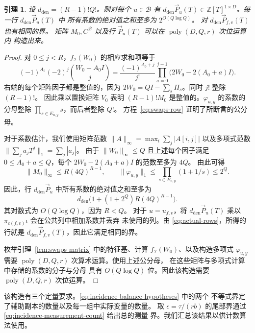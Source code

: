 \documentclass[11pt,reqno]{amsart}
\numberwithin{equation}{section}
\newtheorem{lemma}[theorem]{引理}
\theoremstyle{definition}\newtheorem{definition}[theorem]{定义}
\theoremstyle{remark}\newtheorem{remark}[theorem]{注}
\newcommand{\poly}{\operatorname{poly}}
\renewcommand{\le}{\leqslant}
\begin{document}
\begin{lemma}\label{lem:row-coefficients}
设 $d_{\mathrm{den}}=(R-1)!Q!$。则对每个 $u\in\mathcal B$ 有
$d_{\mathrm{den}}\vec{P}_u(T)\in\mathbb Z[T]^{1\times D}$。每一行 $d_{\mathrm{den}}\vec{P}_u(T)$ 中
所有系数的绝对值之和至多为 $2^{O(Q\log Q)}$。
对 $d_{\mathrm{den}}\vec{P}_{f,v}(T)$ 也有相同的界。
矩阵 $M_0,C^{\mathcal B}$ 以及行 $\vec{P}_u(T)$ 可以在 $\poly(D,Q,r)$ 次位运算内
构造出来。
\end{lemma}
\begin{proof}
对 $0\le j<R$，$f_{\mathcal I}(W_0)$ 的相应求和项等于
\[
 (-1)^{A_0}(-2)^j\binom{W_0-A_0I}{j}
 =\frac{(-1)^{A_0+j}}{j!}
   \prod_{a=0}^{j-1}\bigl(2W_0-2(A_0+a)I\bigr).
\]
右端的每个矩阵因子都是整值的，因为
$2W_0=QI-\sum_s\Pi_s$。同时 $j!$ 整除 $(R-1)!$。
因此乘以置换矩阵 $V_0$ 表明
$(R-1)!M_0$ 是整值的。$\varphi_{u,y}$ 的系数的
分母整除 $\prod_{s\in E_{u,y}}s$，而后者整除 $Q!$。
方程~\eqref{eq:swaps-row} 证明了所断言的公分母。

对于系数估计，我们使用矩阵范数
$\|A\|_\infty=\max_i\sum_j|A[i,j]|$
以及多项式范数 $\|\sum_j a_jT^j\|_1=\sum_j|a_j|$。
由于 $\|W_0\|_\infty\le Q$ 且上述每个因子满足 $0\le A_0+a\le Q$，每个 $2W_0-2(A_0+a)I$ 的范数至多为 $4Q$。
由此可得
\[
 \|M_0\|_\infty\le R(4Q)^{R-1},\qquad
 \|\varphi_{u,y}\|_1
 \le\prod_{s\in E_{u,y}}(1+1/s)\le2^Q.
\]
因此，行 $d_{\mathrm{den}}\vec{P}_u$ 中所有系数的绝对值之和至多为
\[
 d_{\mathrm{den}}\bigl(1+(1+2^Q)R(4Q)^{R-1}\bigr).
\]
其对数式为 $O(Q\log Q)$，因为 $R<Q$。
对于 $u=u_{f,v}$，将 $d_{\mathrm{den}}\vec{P}_u(T)$ 乘以
$\pi_{c(f,v)}\iota$ 会在公共列中相加系数并丢弃
未使用的列。由 \eqref{eq:actual-rows}，所得的行就是
$d_{\mathrm{den}}\vec{P}_{f,v}(T)$，因此它满足相同的界。

枚举引理~\ref{lem:swaps-matrix} 中的特征基、计算
$f_{\mathcal I}(W_0)$、以及构造多项式 $\varphi_{u,y}$
需要 $\poly(D,Q,r)$ 次算术运算。使用上述公分母，
在这些矩阵与多项式计算中存储的系数的分子与分母
具有 $O(Q\log Q)$ 位。因此该构造需要 $\poly(D,Q,r)$ 次位运算。
\end{proof}

该构造有三个定量要求。\eqref{eq:incidence-balance-hypotheses} 中的两个
不等式界定了辅助副本的数量以及每一组中实际变量的数量。
取 $\epsilon=\tau/(rb)$ 的尾部界通过 \eqref{eq:incidence-measurement-count} 给出总的测量
界。我们汇总该结果以供计数算法使用。
\end{document}
